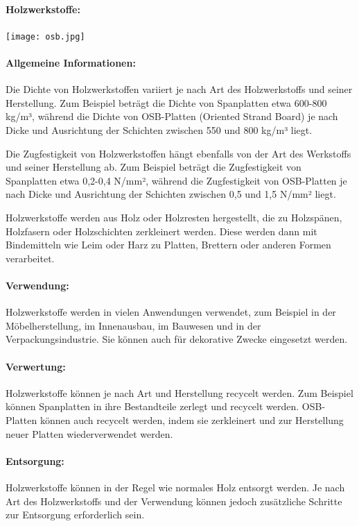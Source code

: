 \documentclass{article}
\begin{document}
\begin{multicols}{3}

\paragraph{Holzwerkstoffe:}

\texttt{[image: osb.jpg]}

\paragraph{Allgemeine Informationen:}
Die Dichte von Holzwerkstoffen variiert je nach Art des Holzwerkstoffs und
seiner Herstellung. Zum Beispiel beträgt die Dichte von Spanplatten etwa
600-800 kg/m³, während die Dichte von OSB-Platten (Oriented Strand Board) je
nach Dicke und Ausrichtung der Schichten zwischen 550 und 800 kg/m³ liegt.

Die Zugfestigkeit von Holzwerkstoffen hängt ebenfalls von der Art des
Werkstoffs und seiner Herstellung ab. Zum Beispiel beträgt die Zugfestigkeit
von Spanplatten etwa 0,2-0,4 N/mm², während die Zugfestigkeit von OSB-Platten
je nach Dicke und Ausrichtung der Schichten zwischen 0,5 und 1,5 N/mm² liegt.

Holzwerkstoffe werden aus Holz oder Holzresten hergestellt, die zu Holzspänen,
Holzfasern oder Holzschichten zerkleinert werden. Diese werden dann mit
Bindemitteln wie Leim oder Harz zu Platten, Brettern oder anderen Formen
verarbeitet.

\paragraph{Verwendung:}
Holzwerkstoffe werden in vielen Anwendungen verwendet, zum Beispiel in der
Möbelherstellung, im Innenausbau, im Bauwesen und in der Verpackungsindustrie.
Sie können auch für dekorative Zwecke eingesetzt werden.

\paragraph{Verwertung:}
Holzwerkstoffe können je nach Art und Herstellung recycelt werden. Zum Beispiel
können Spanplatten in ihre Bestandteile zerlegt und recycelt werden.
OSB-Platten können auch recycelt werden, indem sie zerkleinert und zur
Herstellung neuer Platten wiederverwendet werden.

\paragraph{Entsorgung:}
Holzwerkstoffe können in der Regel wie normales Holz entsorgt werden. Je nach
Art des Holzwerkstoffs und der Verwendung können jedoch zusätzliche Schritte
zur Entsorgung erforderlich sein.


\end{multicols}
\end{document}
